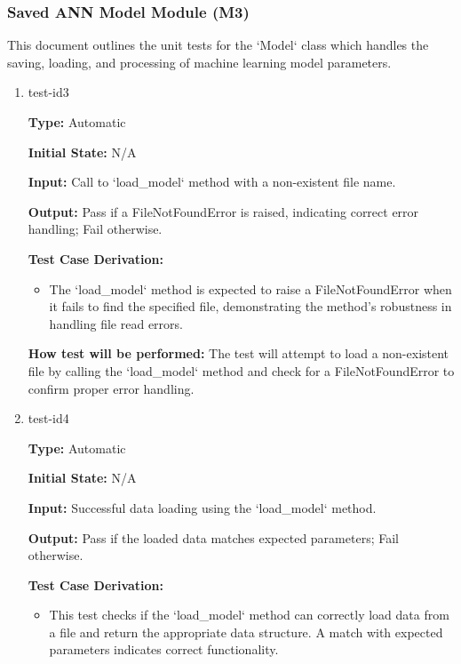 \documentclass[12pt, titlepage]{article}
\begin{document}
\subsubsection{ Saved ANN Model Module (M3)}
This document outlines the unit tests for the `Model` class which handles the 
saving, loading, and processing of machine learning model parameters.

\begin{enumerate}

  \item{test-id3\\}
  
  \textbf{Type:} Automatic
  
  \textbf{Initial State:} N/A
  
  \textbf{Input:} Call to `load\_model` method with a non-existent file name.
  
  \textbf{Output:} Pass if a FileNotFoundError is raised, indicating correct 
  error handling; Fail otherwise.
  
  \textbf{Test Case Derivation:}
  \begin{itemize}
    \item The `load\_model` method is expected to raise a FileNotFoundError when it 
    fails to find the specified file, demonstrating the method's robustness in handling file read errors.
  \end{itemize}
  
  \textbf{How test will be performed:} 
  The test will attempt to load a non-existent file by calling the `load\_model` 
  method and check for a FileNotFoundError to confirm proper error handling.
  
  \item{test-id4\\}
  
  \textbf{Type:} Automatic
  
  \textbf{Initial State:} N/A
  
  \textbf{Input:} Successful data loading using the `load\_model` method.
  
  \textbf{Output:} Pass if the loaded data matches expected parameters; Fail otherwise.
  
  \textbf{Test Case Derivation:}
  \begin{itemize}
    \item This test checks if the `load\_model` method can correctly load data 
    from a file and return the appropriate data structure. A match with expected 
    parameters indicates correct functionality.
  \end{itemize}
  

\end{enumerate}
\end{document}
